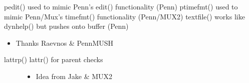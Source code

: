 \documentclass[letterpaper,10pt,english]{sphinxmanual}
\begin{document}
\sphinxAtStartPar
pedit() \sphinxhyphen{} used to mimic Penn’s edit() functionality (Penn)
ptimefmt() \sphinxhyphen{} used to mimic Penn/Mux’s timefmt() functionality (Penn/MUX2)
textfile() \sphinxhyphen{} works like dynhelp() but pushes onto buffer (Penn)
\begin{itemize}
\item {} 
\sphinxAtStartPar
Thanks Raevnos \& PennMUSH

\end{itemize}
\begin{description}
\item[{lattrp() \sphinxhyphen{} lattr() for parent checks}] \leavevmode\begin{itemize}
\item {} 
\sphinxAtStartPar
Idea from Jake \& MUX2

\end{itemize}

\end{description}
\end{document}
